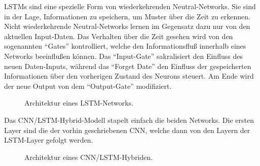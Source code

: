 LSTMs\cite{hochreiter97} sind eine spezielle Form von wiederkehrenden Neutral-Networks.
Sie sind in der Lage, Informationen zu speichern, um Muster über die Zeit zu erkennen. 
Nicht wiederkehrende Neutral-Networks lernen im Gegensatz dazu nur von den aktuellen Input-Daten.
Das Verhalten über die Zeit gesehen wird von den sogenannten ``Gates'' kontrolliert, welche den Informationsfluß innerhalb eines Networks beeinflußen können.
Das ``Input-Gate'' sakralisiert den Einfluss des neuen Daten-Inputs, während das ``Forget Date'' den Einfluss der gespeicherten Informationen über den vorherigen Zustand des Neurons steuert.
Am Ende wird der neue Output von dem ``Output-Gate'' modifiziert. \\


\begin{figure}[H]
\caption{Architektur eines LSTM-Networks. }
\label{fig:lstm} \end{figure} \vspace{0.5cm}


Das CNN/LSTM-Hybrid-Modell stapelt einfach die beiden Networks.
Die ersten Layer sind die der vorhin geschriebenen CNN, welche dann von den Layern der LSTM-Layer gefolgt werden. \\


\begin{figure}[H]
\caption{Architektur eines CNN/LSTM-Hybriden. }
\label{fig:cnn_lstm} \end{figure} \vspace{0.5cm}














